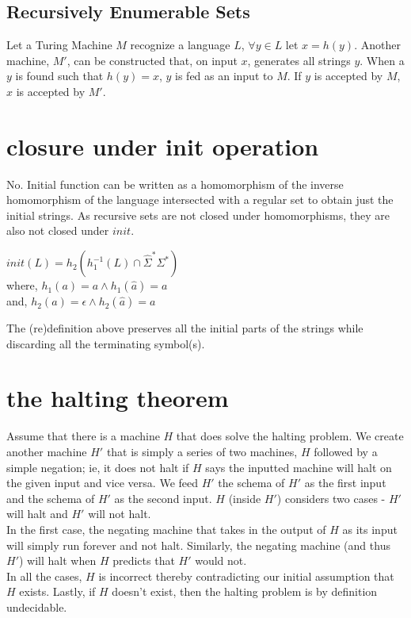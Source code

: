 \documentclass[11pt,letterpaper]{article}
\begin{document}
\subsection{Recursively Enumerable Sets}
Let a Turing Machine $M$ recognize a language $L$, $\forall y \in L$ let $x = h(y)$. Another machine, $M'$, can be constructed that, on input $x$, generates all strings $y$. When a $y$ is found such that $h(y)=x$, $y$ is fed as an input to $M$. If $y$ is accepted by $M$, $x$ is accepted by $M'$.

\section{closure under init operation}
No. Initial function can be written as a homomorphism of the inverse homomorphism of the language intersected with a regular set to obtain just the initial strings. As recursive sets are not closed under homomorphisms, they are also not closed under $init$.
\begin{center}
    $init(L) = h_2(h_1^{-1}(L) \cap \widehat{\Sigma}^* \Sigma^*)$ \\
    where, $h_1(a) = a \wedge h_1(\widehat{a}) = a$ \\
    and, $h_2(a) = \epsilon \wedge h_2(\widehat{a}) = a$
\end{center}
The (re)definition above preserves all the initial parts of the strings while discarding all the terminating symbol(s).

\section{the halting theorem}
Assume that there is a machine $H$ that does solve the halting problem. We create another machine $H'$ that is simply a series of two machines, $H$ followed by a simple negation; ie, it does not halt if $H$ says the inputted machine will halt on the given input and vice versa. We feed $H'$ the schema of $H'$ as the first input and the schema of $H'$ as the second input. $H$ (inside $H'$) considers two cases - $H'$ will halt and $H'$ will not halt. \\
In the first case, the negating machine that takes in the output of $H$ as its input will simply run forever and not halt. Similarly, the negating machine (and thus $H'$) will halt when $H$ predicts that $H'$ would not. \\
In all the cases, $H$ is incorrect thereby contradicting our initial assumption that $H$ exists. Lastly, if $H$ doesn't exist, then the halting problem is by definition undecidable.
\end{document}
